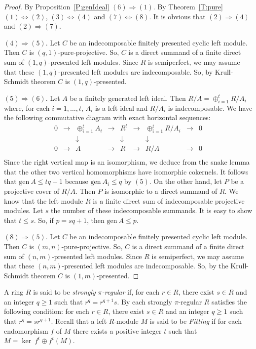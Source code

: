 \documentclass{amsart}
\begin{document}
\begin{proof}
By Proposition~\ref{P:genIdeal} $(6)\Rightarrow (1)$. By Theorem~\ref{T:pure} $(1)\Leftrightarrow (2)$, $(3)\Leftrightarrow (4)$ and $(7)\Leftrightarrow (8)$. It is obvious that $(2)\Rightarrow (4)$ and $(2)\Rightarrow (7)$.

$(4)\Rightarrow (5)$. Let $C$ be an indecomposable finitely presented cyclic left module. Then $C$ is $(q,1)$-pure-projective. So, $C$ is a direct summand of a finite direct sum of $(1,q)$-presented left modules. Since $R$ is semiperfect, we may assume that these $(1,q)$-presented left modules are indecomposable.  So, by Krull-Schmidt theorem $C$ is $(1,q)$-presented.

$(5)\Rightarrow (6)$. Let $A$ be a finitely generated left ideal. Then $R/A=\oplus_{i=1}^tR/A_i$ where, for each $i=1,\dots,t$, $A_i$ is a left ideal and $R/A_i$ is indecomposable. We have the following commutative diagram with exact horizontal sequences:
\[\begin{matrix}
0 & \rightarrow & \oplus_{i=1}^tA_i & \rightarrow & R^t & \rightarrow & \oplus_{i=1}^tR/A_i & \rightarrow & 0 \\
{} & {} & \downarrow & {} & \downarrow & {} & \downarrow & {} & {} \\
0 & \rightarrow & A & \rightarrow & R & \rightarrow & R/A & \rightarrow & 0 \\
\end{matrix}\]
Since the right vertical map is an isomorphism, we deduce from the snake lemma that the other two vertical homomorphisms have isomorphic cokernels. It follows that $\mathrm{gen}\ A\leq tq+1$ because $\mathrm{gen}\ A_i\leq q$ by $(5)$. On the other hand, let $P$ be a projective cover of $R/A$. Then $P$ is isomorphic to a direct summand of $R$. We know that the left module $R$ is a finite direct sum of indecomposable projective modules. Let $s$ the number of these indecomposable summands. It is easy to show that $t\leq s$. So, if $p=sq+1$, then $\mathrm{gen}\ A\leq p$.

$(8)\Rightarrow (5)$. Let $C$ be an indecomposable finitely presented cyclic left module. Then $C$ is $(m,n)$-pure-projective. So, $C$ is a direct summand of a finite direct sum of $(n,m)$-presented left modules. Since $R$ is semiperfect, we may assume that these $(n,m)$-presented left modules are indecomposable.  So, by the Krull-Schmidt theorem $C$ is $(1,m)$-presented.
\end{proof}

A ring $R$ is said to be \textit{strongly $\pi$-regular} if, for each $r\in R$, there exist $s\in R$ and an integer $q\geq 1$ such that $r^q=r^{q+1}s$. By \cite[Theorem 3.16]{Fac98} each strongly $\pi$-regular $R$ satisfies the following condition: for each $r\in R$, there exist $s\in R$ and an integer $q\geq 1$ such that $r^q=sr^{q+1}$. Recall that a left  $R$-module $M$ is said to be {\it Fitting} if for each endomorphism $f$ of $M$ there exists a positive integer $t$ such that $M=\ker\ f^t\oplus f^t(M)$.
\end{document}
